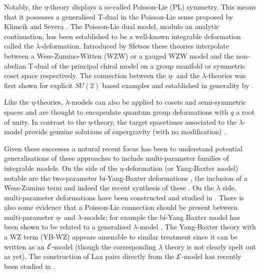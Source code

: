 \documentclass[12pt]{article}
\begin{document}
 
  
  
 Notably, the $\eta$-theory displays a so-called Poisson-Lie (PL) symmetry. This means that it possesses a generalised T-dual in the Poisson-Lie sense proposed by Klimcik and Severa \cite{Klimcik:1995ux}. The Poisson-Lie dual model, modulo an analytic continuation, has been established to be a well-known integrable deformation called the $\lambda$-deformation.  Introduced by Sfetsos \cite{Sfetsos:2013wia} these theories interpolate between a Wess-Zumino-Witten (WZW)  \cite{Witten:1983ar} or a gauged WZW model  and the non-abelian T-dual of the principal chiral model on a group manifold or symmetric coset space respectively. The connection between the $\eta$- and the $\lambda$-theories was first shown for explicit $SU(2)$ based examples \cite{Hoare:2015gda,Sfetsos:2015nya} and established in generality by \cite{Klimcik:2015gba,Hoare:2017ukq}.  
     
 
Like the $\eta$-theories, $\lambda$-models can also be applied to cosets   \cite{Hollowood:2014rla} and semi-symmetric spaces 
 \cite{Hollowood:2014qma} and are thought to encapsulate quantum group deformations with $q$ a root of unity.  In contrast to the $\eta$-theory, the target spacetimes associated to the $\lambda$-model provide genuine solutions of supergravity (with no modification) \cite{Sfetsos:2014cea,Demulder:2015lva,Borsato:2016ose,Borsato:2016zcf,Chervonyi:2016ajp}.   
 

  

 
 Given these successes a natural recent focus has been to understand potential generalisations of these approaches to include multi-parameter families of integrable models. On the side of the $\eta$-deformation (or Yang-Baxter model) notable are the two-parameter bi-Yang-Baxter deformations  \cite{Klimcik:2014bta}, the inclusion of a Wess-Zumino term \cite{Delduc:2014uaa} and indeed the recent synthesis of these \cite{Delduc:2017fib}. On the $\lambda$ side, multi-parameter deformations have been constructed and studied in \cite{Sfetsos:2014lla,Sfetsos:2015nya,Chervonyi:2016bfl,Appadu:2017bnv}.   There is also some evidence that a Poisson-Lie connection should be present between multi-parameter $\eta$- and $\lambda$-models; for example the  bi-Yang Baxter model has been shown to be related to a generalised $\lambda$-model \cite{Klimcik:2016rov}.  The Yang-Baxter theory with a WZ term (YB-WZ) appears amenable to similar treatment since it can be written as an ${\cal E}$-model \cite{Klimcik:2017ken} (though the corresponding $\lambda$ theory is not clearly spelt out as yet).  The construction of Lax pairs directly from the   ${\cal E}$-model  has recently been studied in  \cite{Severa:2017kcs}.
 
\end{document}
